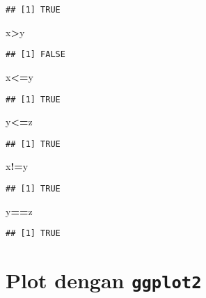 \documentclass[
]{book}
\newenvironment{Shaded}{\begin{snugshade}}{\end{snugshade}}
\newcommand{\NormalTok}[1]{#1}
\newcommand{\OperatorTok}[1]{\textcolor[rgb]{0.81,0.36,0.00}{\textbf{#1}}}
\begin{document}
\begin{verbatim}
## [1] TRUE
\end{verbatim}

\begin{Shaded}
\begin{Highlighting}[]
\NormalTok{x}\OperatorTok{>}\NormalTok{y}
\end{Highlighting}
\end{Shaded}

\begin{verbatim}
## [1] FALSE
\end{verbatim}

\begin{Shaded}
\begin{Highlighting}[]
\NormalTok{x}\OperatorTok{<=}\NormalTok{y}
\end{Highlighting}
\end{Shaded}

\begin{verbatim}
## [1] TRUE
\end{verbatim}

\begin{Shaded}
\begin{Highlighting}[]
\NormalTok{y}\OperatorTok{<=}\NormalTok{z}
\end{Highlighting}
\end{Shaded}

\begin{verbatim}
## [1] TRUE
\end{verbatim}

\begin{Shaded}
\begin{Highlighting}[]
\NormalTok{x}\OperatorTok{!=}\NormalTok{y}
\end{Highlighting}
\end{Shaded}

\begin{verbatim}
## [1] TRUE
\end{verbatim}

\begin{Shaded}
\begin{Highlighting}[]
\NormalTok{y}\OperatorTok{==}\NormalTok{z}
\end{Highlighting}
\end{Shaded}

\begin{verbatim}
## [1] TRUE
\end{verbatim}

\hypertarget{plot-dengan-ggplot2}{%
\chapter{\texorpdfstring{Plot dengan \texttt{ggplot2}}{Plot dengan ggplot2}}\label{plot-dengan-ggplot2}}
\end{document}
